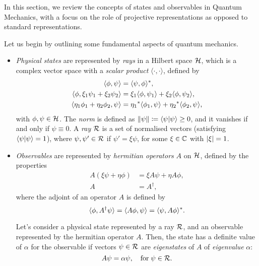 In this section, we review the concepts of states and observables in Quantum Mechanics, with a focus on the role of projective representations as opposed to standard representations.

Let us begin by outlining some fundamental aspects of quantum mechanics.
\begin{itemize}
    \item \emph{Physical states} are represented by \emph{rays} in a Hilbert space $\mathcal{H}$, which is a complex vector space with a \emph{scalar product} $\langle \cdot, \cdot \rangle$, defined by
    \begin{subequations}\label{eq:scalar-product}
        \begin{align}
        \langle \phi, \psi \rangle &= \langle \psi, \phi \rangle^* , \\
        \langle \phi, \xi_1 \psi_1 + \xi_2 \psi_2 \rangle &= \xi_1 \langle \phi, \psi_1 \rangle + \xi_2 \langle \phi, \psi_2 \rangle ,\\
        \langle \eta_1 \phi_1 + \eta_2 \phi_2, \psi \rangle &= {\eta_1}^* \langle \phi_1, \psi \rangle + {\eta_2}^* \langle \phi_2, \psi \rangle ,
        \end{align}
        \end{subequations}
    with $\phi,\psi \in \mathcal{H}$. The \emph{norm} is defined as $\lVert\psi\rVert \coloneq \braket{\psi}{\psi} \geq 0$, and it vanishes if and only if $\psi \equiv 0$. A \emph{ray} $\mathcal{R}$ is a set of normalised vectors (satisfying $\braket{\psi}{\psi} = 1$), where $\psi, \psi' \in \mathcal{R}$ if $\psi' = \xi \psi$, for some $\xi \in \mathbb{C}$ with $\abs{\xi} = 1$.
    \item \emph{Observables} are represented by \emph{hermitian operators} $A$ on $\mathcal{H}$, defined by the properties
    \begin{subequations}
    \begin{align}
        A (\xi \psi + \eta \phi) &= \xi A\psi + \eta A \phi ,\\
        A &= A^\dagger ,
    \end{align}
    \end{subequations}
    where the adjoint of an operator $A$ is defined by
    \begin{equation}\label{eq:def-adjoint}
        \langle \phi, A^\dagger \psi \rangle = \langle A\phi, \psi \rangle = \langle \psi, A\phi \rangle^* .
    \end{equation}

    Let's consider a physical state represented by a ray $\mathcal{R}$, and an observable represented by the hermitian operator $A$. Then, the state has a definite value of $\alpha$ for the observable if vectors $\psi \in \mathcal{R}$ are \emph{eigenstates} of $A$ of \emph{eigenvalue} $\alpha$:
    \begin{equation}
        A\psi = \alpha \psi, \quad \textup{for} \; \psi \in \mathcal{R} .
    \end{equation}


\end{itemize}

